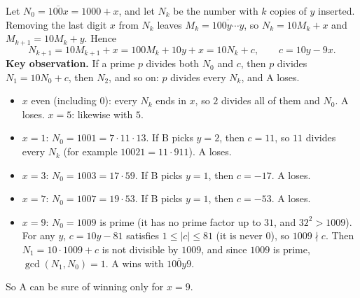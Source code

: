 Let $N_0=\overline{100x}=1000+x$, and let $N_k$ be the number with $k$ copies of $y$ inserted. Removing the last digit $x$ from $N_k$ leaves $M_k=\overline{100y\cdots y}$, so $N_k=10M_k+x$ and $M_{k+1}=10M_k+y$. Hence
\[N_{k+1}=10M_{k+1}+x=100M_k+10y+x=10N_k+c,\qquad c=10y-9x.\]
\textbf{Key observation.} If a prime $p$ divides both $N_0$ and $c$, then $p$ divides $N_1=10N_0+c$, then $N_2$, and so on: $p$ divides every $N_k$, and A loses.
\begin{itemize}
\item $x$ even (including $0$): every $N_k$ ends in $x$, so $2$ divides all of them and $N_0$. A loses. $x=5$: likewise with $5$.
\item $x=1$: $N_0=1001=7\cdot11\cdot13$. If B picks $y=2$, then $c=11$, so $11$ divides every $N_k$ (for example $10021=11\cdot911$). A loses.
\item $x=3$: $N_0=1003=17\cdot59$. If B picks $y=1$, then $c=-17$. A loses.
\item $x=7$: $N_0=1007=19\cdot53$. If B picks $y=1$, then $c=-53$. A loses.
\item $x=9$: $N_0=1009$ is prime (it has no prime factor up to $31$, and $32^2>1009$). For any $y$, $c=10y-81$ satisfies $1\le|c|\le81$ (it is never $0$), so $1009\nmid c$. Then $N_1=10\cdot1009+c$ is not divisible by $1009$, and since $1009$ is prime, $\gcd(N_1,N_0)=1$. A wins with $\overline{100y9}$.
\end{itemize}
So A can be sure of winning only for $\boxed{x=9}$.
